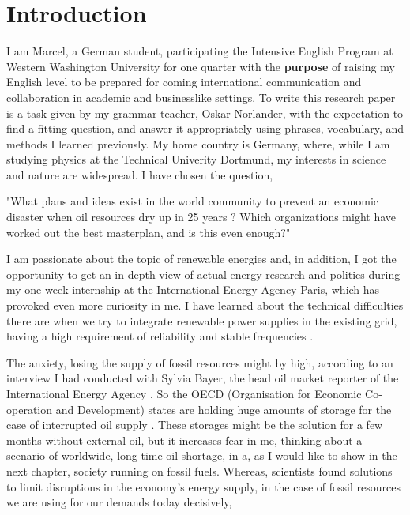 \section{Introduction}%
\label{sec:introduction}
I am Marcel, a German student, participating the Intensive English Program at Western Washington University for one quarter
with the \textbf{purpose} of raising my English level to be prepared for coming international communication and collaboration in 
academic and businesslike settings.
To write this research paper is a task given by my grammar teacher, Oskar Norlander, with the expectation to find a fitting 
question, and answer it appropriately using phrases, vocabulary, and methods I learned previously.
My home country is Germany, where, while I am studying physics at the Technical Univerity Dortmund, my interests in science and nature
are widespread. I have chosen the question, 
\par
"What plans and ideas exist in the world community to prevent an economic 
disaster when oil resources dry up in 25 years \cite[14]{BP} \cite{Industries}? Which organizations 
might have worked out the best masterplan, and is this even enough?"
\par
I am passionate about the topic of renewable energies and, in addition, I  got the opportunity to get an in-depth view
of actual energy research and politics during my one-week internship at the International Energy Agency Paris, which has provoked even
more curiosity in me. 
I have learned about the technical difficulties there are when we try to integrate renewable power supplies in the existing grid,
having a high requirement of reliability and stable frequencies \cite{inertia}.
\par
The anxiety, losing the supply of fossil resources might by high, according  to an interview I had conducted with Sylvia Bayer, the head oil market reporter of the International Energy Agency \cite{IEAApril}.
So the OECD (Organisation for Economic Co-operation and Development) states are holding huge amounts of storage for the case of interrupted oil supply \cite[42]{IEAApril}. 
These storages might be the solution for a few months without external oil, but it increases fear in me, 
thinking about a scenario of worldwide, long time oil shortage, in a, as I would like to show in the next chapter, society running on fossil fuels.
Whereas, scientists \cite{NY_Jacobson} found solutions to limit disruptions in the economy's energy supply, in the case of fossil resources we are using for our demands today decisively,

